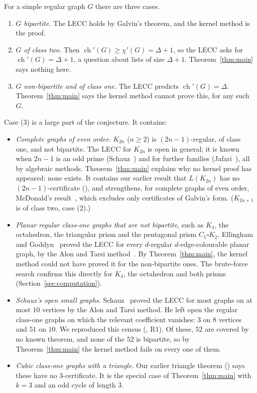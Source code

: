 \documentclass[11pt]{article}
\theoremstyle{plain}
\theoremstyle{definition}
\theoremstyle{remark}
\newcommand{\chil}{\operatorname{ch}'}
\newcommand{\chie}{\chi'}
\begin{document}
For a simple regular graph $G$ there are three cases.
\begin{enumerate}[label=(\arabic*)]
  \item \emph{$G$ bipartite.} The LECC holds by Galvin's theorem, and the kernel method is the
    proof.
  \item \emph{$G$ of class two.} Then $\chil(G)\ge\chie(G)=\Delta+1$, so the LECC asks for
    $\chil(G)=\Delta+1$, a question about lists of size $\Delta+1$. Theorem~\ref{thm:main} says
    nothing here.
  \item \emph{$G$ non-bipartite and of class one.} The LECC predicts $\chil(G)=\Delta$.
    Theorem~\ref{thm:main} says the kernel method cannot prove this, for any such $G$.
\end{enumerate}
Case (3) is a large part of the conjecture. It contains:
\begin{itemize}
  \item \emph{Complete graphs of even order.} $K_{2n}$ ($n\ge 2$) is $(2n-1)$-regular, of class
    one, and not bipartite. The LECC for $K_{2n}$ is open in general; it is known when $2n-1$ is
    an odd prime (Schauz~\cite{schauz14}) and for further families (Jafari~\cite{jafari}), all by
    algebraic methods. Theorem~\ref{thm:main} explains why no kernel proof has appeared: none
    exists. It contains our earlier result that $L(K_{2n})$ has no $(2n-1)$-certificate
    (), and strengthens, for complete graphs of even order, McDonald's result~\cite{mcd},
    which excludes only certificates of Galvin's form. ($K_{2n+1}$ is of class two, case (2).)
  \item \emph{Planar regular class-one graphs that are not bipartite}, such as $K_4$, the
    octahedron, the triangular prism and the pentagonal prism $C_5\square K_2$. Ellingham and
    Goddyn~\cite{eg} proved the LECC for every $d$-regular $d$-edge-colourable planar graph, by
    the Alon and Tarsi method~\cite{at}. By Theorem~\ref{thm:main}, the kernel method could not
    have proved it for the non-bipartite ones. The brute-force search confirms this directly for
    $K_4$, the octahedron and both prisms (Section~\ref{sec:computation}).
  \item \emph{Schauz's open small graphs.} Schauz~\cite{schauz17} proved the LECC for most graphs
    on at most $10$ vertices by the Alon and Tarsi method. He left open the regular class-one
    graphs on which the relevant coefficient vanishes: $3$ on $8$ vertices and $51$ on $10$. We
    reproduced this census (, R1). Of these, $52$ are covered by no
    known theorem, and none of the $52$ is bipartite, so by Theorem~\ref{thm:main} the kernel
    method fails on every one of them.
  \item \emph{Cubic class-one graphs with a triangle.} Our earlier triangle theorem
    () says these have no $3$-certificate. It is the special case of
    Theorem~\ref{thm:main} with $k=3$ and an odd cycle of length $3$.
\end{itemize}
\end{document}
